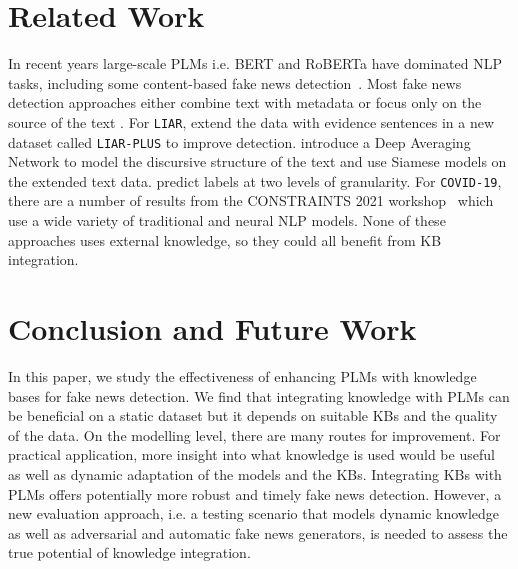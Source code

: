\documentclass[letterpaper]{article} %
\begin{document}
\section{Related Work}

In recent years large-scale PLMs i.e. BERT and RoBERTa have dominated NLP tasks, including some content-based fake news detection~\cite{Kaliyar2021FakeBERT}. 
Most fake news detection approaches either combine text with metadata \citep[e.g.][]{ding2020bert} or focus only on the source of the text \citep[e.g.][]{gruppi2022nela}.
%
%
For \texttt{LIAR}, \citet{alhindi-etal-2018-evidence} extend the data with evidence sentences in a new dataset called \texttt{LIAR-PLUS} to improve detection.
\citet{Chernyavskiy2020RecursiveNT} introduce a Deep Averaging Network to model the discursive structure of the text and use Siamese models on the extended text data. 
\citet{Liu2019ATM} predict labels at two levels of granularity.
For \texttt{COVID-19}, there are a number of results from the CONSTRAINTS 2021 workshop~\cite{chakraborty2021combating} which use a wide variety of traditional and neural NLP models. 
None of these approaches uses external knowledge, so they could all benefit from KB integration. 


\section{Conclusion and Future Work}

In this paper, we study the effectiveness of enhancing PLMs with knowledge bases for fake news detection. 
We find that integrating knowledge with PLMs can be beneficial on a static dataset but it depends on suitable KBs and the quality of the data. 
On the modelling level, there are many routes for improvement. 
For practical application, more insight into what knowledge is used would be useful as well as dynamic adaptation of the models and the KBs. 
Integrating KBs with PLMs offers potentially more robust and timely fake news detection. However, a new evaluation approach, i.e. a testing scenario that models dynamic knowledge as well as adversarial and automatic fake news generators, is needed to assess the true potential of knowledge integration. 



\end{document}

